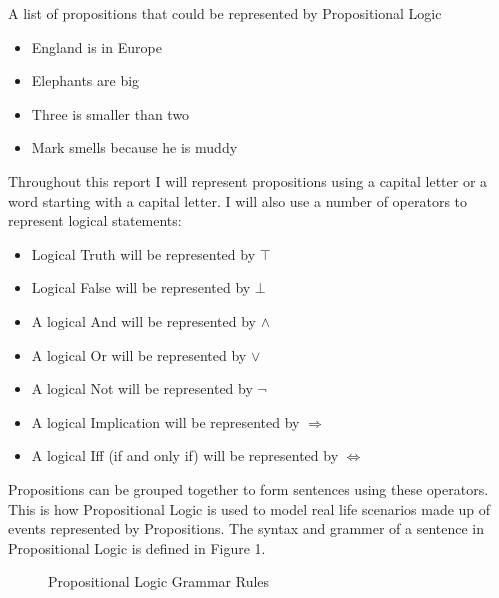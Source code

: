 \begin{exmp}A list of propositions that could be represented by Propositional Logic
\begin{itemize}
\item England is in Europe
\item Elephants are big
\item Three is smaller than two
\item Mark smells because he is muddy
\end{itemize}
\end{exmp}

Throughout this report I will represent propositions using a capital letter or a word starting with a capital letter. I will also use a number of operators to represent logical statements:
\begin{itemize}
\item Logical Truth will be represented by $\top$
\item Logical False will be represented by $\bot$
\item A logical And will be represented by $\wedge$
\item A logical Or will be represented by $\vee$
\item A logical Not will be represented by $\neg$
\item A logical Implication will be represented by $\Rightarrow$
\item A logical Iff (if and only if) will be represented by $\Leftrightarrow$
\end{itemize}

Propositions can be grouped together to form sentences using these operators. This is how Propositional Logic is used to model real life scenarios made up of events represented by Propositions. The syntax and grammer of a sentence in Propositional Logic is defined in Figure 1.

\begin{figure}[!ht]
  \centering
  \caption{Propositional Logic Grammar Rules}
\end{figure}

